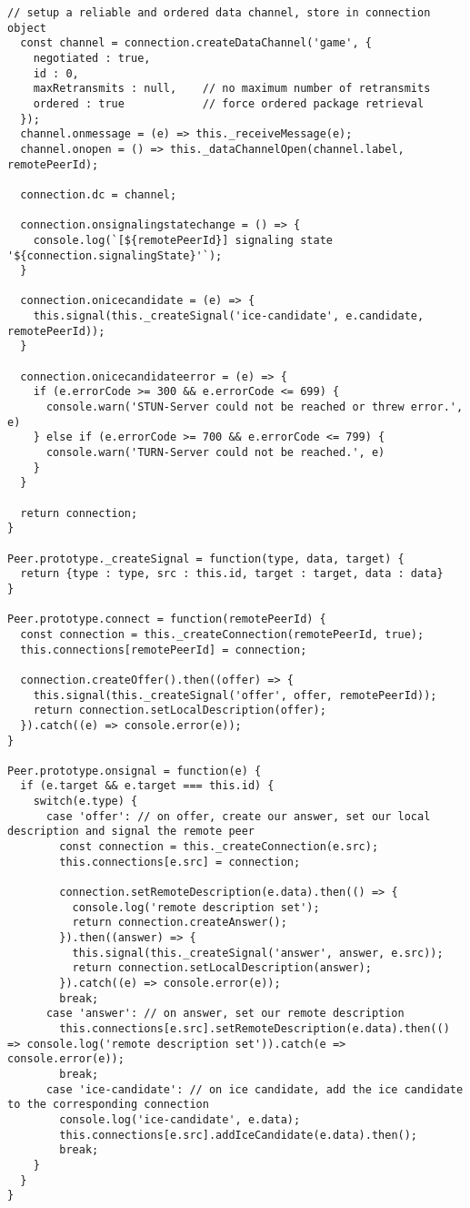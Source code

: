 \begin{singlespace}
\begin{lstlisting}[]
  // setup a reliable and ordered data channel, store in connection object
  const channel = connection.createDataChannel('game', {
    negotiated : true,
    id : 0,
    maxRetransmits : null,    // no maximum number of retransmits
    ordered : true            // force ordered package retrieval
  });
  channel.onmessage = (e) => this._receiveMessage(e);
  channel.onopen = () => this._dataChannelOpen(channel.label, remotePeerId);

  connection.dc = channel;

  connection.onsignalingstatechange = () => {
    console.log(`[${remotePeerId}] signaling state '${connection.signalingState}'`);
  }

  connection.onicecandidate = (e) => {
    this.signal(this._createSignal('ice-candidate', e.candidate, remotePeerId));
  }

  connection.onicecandidateerror = (e) => {
    if (e.errorCode >= 300 && e.errorCode <= 699) {
      console.warn('STUN-Server could not be reached or threw error.', e)
    } else if (e.errorCode >= 700 && e.errorCode <= 799) {
      console.warn('TURN-Server could not be reached.', e)
    }
  }

  return connection;
}

Peer.prototype._createSignal = function(type, data, target) {
  return {type : type, src : this.id, target : target, data : data}
}

Peer.prototype.connect = function(remotePeerId) {
  const connection = this._createConnection(remotePeerId, true);
  this.connections[remotePeerId] = connection;

  connection.createOffer().then((offer) => {
    this.signal(this._createSignal('offer', offer, remotePeerId));
    return connection.setLocalDescription(offer);
  }).catch((e) => console.error(e));
}

Peer.prototype.onsignal = function(e) {
  if (e.target && e.target === this.id) {
    switch(e.type) {
      case 'offer': // on offer, create our answer, set our local description and signal the remote peer
        const connection = this._createConnection(e.src);
        this.connections[e.src] = connection;

        connection.setRemoteDescription(e.data).then(() => {
          console.log('remote description set');
          return connection.createAnswer();
        }).then((answer) => {
          this.signal(this._createSignal('answer', answer, e.src));
          return connection.setLocalDescription(answer);
        }).catch((e) => console.error(e));
        break;
      case 'answer': // on answer, set our remote description
        this.connections[e.src].setRemoteDescription(e.data).then(() => console.log('remote description set')).catch(e => console.error(e));
        break;
      case 'ice-candidate': // on ice candidate, add the ice candidate to the corresponding connection
        console.log('ice-candidate', e.data);
        this.connections[e.src].addIceCandidate(e.data).then();
        break;
    }
  }
}


\end{lstlisting}
\end{singlespace}

